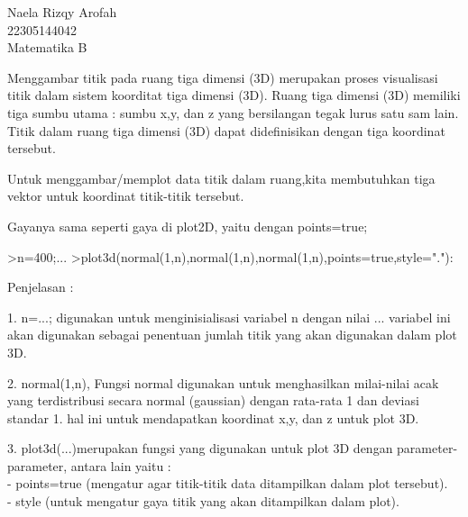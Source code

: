\documentclass[a4paper,10pt]{article}
\begin{document}
\begin{eulernotebook}
\begin{eulercomment}
Naela Rizqy Arofah\\
22305144042\\
Matematika B

\begin{eulercomment}
\begin{eulercomment}
Menggambar titik pada ruang tiga dimensi (3D) merupakan proses
visualisasi titik dalam sistem koorditat tiga dimensi (3D). Ruang tiga
dimensi (3D) memiliki tiga sumbu utama : sumbu x,y, dan z yang
bersilangan tegak lurus satu sam lain. Titik dalam ruang tiga dimensi
(3D) dapat didefinisikan dengan tiga koordinat tersebut.

Untuk menggambar/memplot data titik dalam ruang,kita membutuhkan tiga\\
vektor untuk koordinat titik-titik tersebut.

Gayanya sama seperti gaya di plot2D, yaitu dengan points=true;
\end{eulercomment}
\begin{eulerprompt}
>n=400;...
>plot3d(normal(1,n),normal(1,n),normal(1,n),points=true,style="."):
\end{eulerprompt}
\begin{eulercomment}
Penjelasan :

1. n=...; digunakan untuk menginisialisasi variabel n dengan nilai ...
variabel ini akan digunakan sebagai penentuan jumlah titik yang akan
digunakan dalam plot 3D.

2. normal(1,n), Fungsi normal digunakan untuk menghasilkan milai-nilai
acak yang terdistribusi secara normal (gaussian) dengan rata-rata 1
dan deviasi standar 1. hal ini untuk mendapatkan koordinat x,y, dan z
untuk plot 3D.

3. plot3d(...)merupakan fungsi yang digunakan untuk plot 3D dengan
parameter-parameter, antara lain yaitu :\\
- points=true (mengatur agar titik-titik data ditampilkan dalam plot
tersebut).\\
- style (untuk mengatur gaya titik yang akan ditampilkan dalam plot).


\end{eulercomment}
\end{eulercomment}
\end{eulercomment}
\end{eulernotebook}
\end{document}
